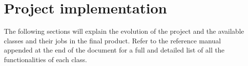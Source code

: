 \chapter{Project implementation}\label{ch:project_implementation}

The following sections will explain the evolution of the project and the available 
classes and their jobs in the final product. Refer to the reference manual appended 
at the end of the document for a full and detailed list of all the functionalities 
of each class.




